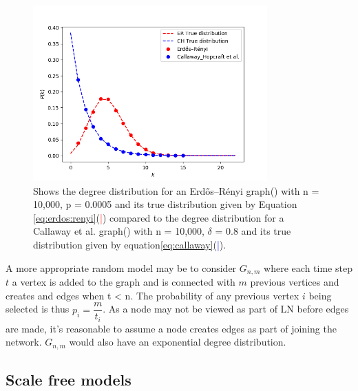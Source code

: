 \begin{figure}[!htb]
		\hspace*{-0.5cm} 
	\centering
	\includegraphics[width=9cm]{images/random_topology_degree_distribution.png}
	\caption{Shows the degree distribution for an Erdős–Rényi graph(\tikzcircle[red, fill=red]{2pt}) with n = 10,000, p = 0.0005 and its true distribution given by Equation \ref{eq:erdos:renyi}(\textcolor{red}{|}) compared to the degree distribution for a Callaway et al. graph(\tikzcircle[blue, fill=blue]{2pt})  with n = 10,000, $\delta$ = 0.8 and its true distribution given by equation\ref{eq:callaway}(\textcolor{blue}{|}).
	}
	\label{fig:callaway:erdos}
		\hspace*{2mm} 
\end{figure}

A more appropriate random model may be to consider $G_{n,m}$ where each time step $t$ a vertex is added to the graph and is connected with $m$ previous vertices and creates and edges when t < n. The probability of any previous vertex $i$ being selected is thus $p_i = \dfrac{m}{t_i}$. 
As a node may not be viewed as part of LN before edges are made, it's reasonable to assume a \gls{node} creates edges as part of joining the network. $G_{n,m}$ would also have an exponential degree distribution.




\subsection{Scale free models}


